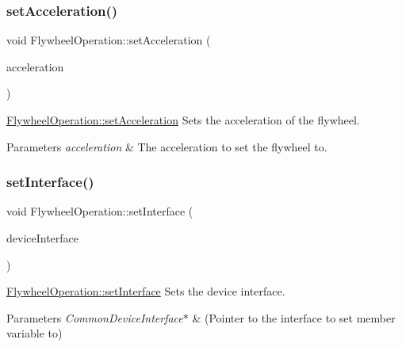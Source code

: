 \subsubsection{\texorpdfstring{set\+Acceleration()}{setAcceleration()}}
{\footnotesize\ttfamily void Flywheel\+Operation\+::set\+Acceleration (\begin{DoxyParamCaption}\item[{float}]{acceleration }\end{DoxyParamCaption})}



\hyperlink{class_flywheel_operation_a307929c750339cb2b46baaafa526d29f}{Flywheel\+Operation\+::set\+Acceleration} Sets the acceleration of the flywheel. 


\begin{DoxyParams}{Parameters}
{\em acceleration} & The acceleration to set the flywheel to. \\
\hline
\end{DoxyParams}
\hypertarget{class_flywheel_operation_ab655d2757d24dbb605a8eb0c16bc0fe8}{}\label{class_flywheel_operation_ab655d2757d24dbb605a8eb0c16bc0fe8} 
\subsubsection{\texorpdfstring{set\+Interface()}{setInterface()}}
{\footnotesize\ttfamily void Flywheel\+Operation\+::set\+Interface (\begin{DoxyParamCaption}\item[{\hyperlink{class_common_device_interface}{Common\+Device\+Interface} $\ast$}]{device\+Interface }\end{DoxyParamCaption})}



\hyperlink{class_flywheel_operation_ab655d2757d24dbb605a8eb0c16bc0fe8}{Flywheel\+Operation\+::set\+Interface} Sets the device interface. 


\begin{DoxyParams}{Parameters}
{\em Common\+Device\+Interface$\ast$} & (Pointer to the interface to set member variable to) \\
\hline
\end{DoxyParams}
\hypertarget{class_flywheel_operation_a4f14dfe672793f37e21f90ecab499378}{}\label{class_flywheel_operation_a4f14dfe672793f37e21f90ecab499378} 
